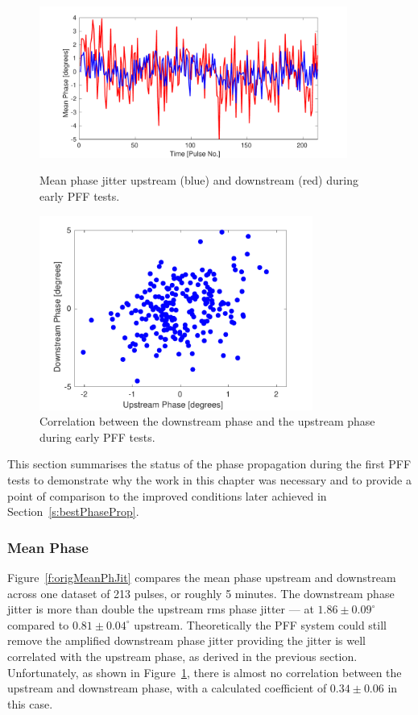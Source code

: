 \begin{figure}
  \centering
  \includegraphics[width=0.9\textwidth]{Figures/propagation/origMeanPhJit}
  \caption{Mean phase jitter upstream (blue) and downstream (red) during early PFF tests.}
   \label{f:origMeanPhJit}
  \includegraphics[width=0.8\textwidth]{Figures/propagation/origUpVsDown}
  \caption{Correlation between the downstream phase and the upstream phase during early PFF tests.}
  \label{f:origUpVsDown}
\end{figure}



This section summarises the status of the phase propagation during the first PFF tests to demonstrate why the work in this chapter was necessary and to provide a point of comparison to the improved conditions later achieved in Section~\ref{s:bestPhaseProp}.

\subsubsection{Mean Phase}



Figure~\ref{f:origMeanPhJit} compares the mean phase upstream and downstream across one dataset of 213 pulses, or roughly 5 minutes. The downstream phase jitter is more than double the upstream rms phase jitter --- at \(1.86\pm0.09^\circ\) compared to \(0.81\pm0.04^\circ\) upstream. Theoretically the PFF system could still remove the amplified downstream phase jitter providing the jitter is well correlated with the upstream phase, as derived in the previous section. Unfortunately, as shown in Figure~\ref{f:origUpVsDown}, there is almost no correlation between the upstream and downstream phase, with a calculated coefficient of \(0.34\pm0.06\) in this case.



